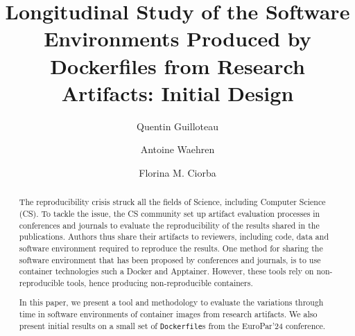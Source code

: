\documentclass[sigconf,natbib=false]{acmart}
\newcommand{\df}{\texttt{Dockerfile}}
\begin{document}
\title{%
  Longitudinal Study of the Software Environments Produced by Dockerfiles from Research Artifacts: Initial Design%
}


\author{Quentin Guilloteau}

\author{Antoine Waehren}

\author{Florina M. Ciorba}



\begin{abstract}
  The reproducibility crisis struck all the fields of Science, including Computer Science (CS).
  To tackle the issue, the CS community set up artifact evaluation processes in conferences and journals to evaluate the reproducibility of the results shared in the publications.
  Authors thus share their artifacts to reviewers, including code, data and software environment required to reproduce the results.
  One method for sharing the software environment that has been proposed by conferences and journals, is to use container technologies such a Docker and Apptainer.
  However, these tools rely on non-reproducible tools, hence producing non-reproducible containers.

  In this paper, we present a tool and methodology to evaluate the variations through time in software environments of container images from research artifacts.
  We also present initial results on a small set of \df s from the EuroPar'24 conference.
\end{abstract}
\end{document}
